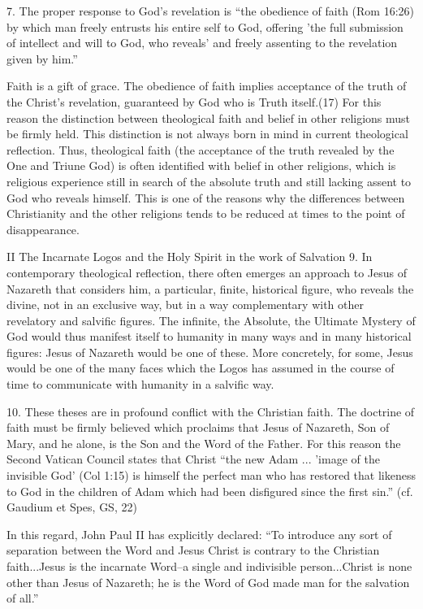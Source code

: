 \documentclass[oneside]{book}
\begin{document}
7. The proper response to God's revelation is ``the obedience of faith (Rom
16:26) by which man freely entrusts his entire self to God, offering 'the full
submission of intellect and will to God, who reveals' and freely assenting to
the revelation given by him.''

Faith is a gift of grace. The obedience of faith implies acceptance of the truth
of the Christ's revelation, guaranteed by God who is Truth itself.(17) For this
reason the distinction between theological faith and belief in other religions
must be firmly held. This distinction is not always born in mind in current
theological reflection. Thus, theological faith (the acceptance of the truth
revealed by the One and Triune God) is often identified with belief in other
religions, which is religious experience still in search of the absolute truth
and still lacking assent to God who reveals himself. This is one of the reasons
why the differences between Christianity and the other religions tends to be
reduced at times to the point of disappearance.

II The Incarnate Logos and the Holy Spirit in the work of Salvation
9. In contemporary theological reflection, there often emerges an approach to
Jesus of Nazareth that considers him, a particular, finite, historical figure,
who reveals the divine, not in an exclusive way, but in a way complementary with
other revelatory and salvific figures. The infinite, the Absolute, the Ultimate
Mystery of God would thus manifest itself to humanity in many ways and in many
historical figures: Jesus of Nazareth would be one of these. More concretely,
for some, Jesus would be one of the many faces which the Logos has assumed in
the course of time to communicate with humanity in a salvific way.

10. These theses are in profound conflict with the Christian faith. The doctrine
of faith must be firmly believed which proclaims that Jesus of Nazareth, Son of
Mary, and he alone, is the Son and the Word of the Father. For this reason the
Second Vatican Council states that Christ ``the new Adam ... 'image of the
invisible God' (Col 1:15) is himself the perfect man who has restored that
likeness to God in the children of Adam which had been disfigured since the
first sin.'' (cf. Gaudium et Spes, GS, 22)

In this regard, John Paul II has explicitly declared: ``To introduce any sort of
separation between the Word and Jesus Christ is contrary to the Christian
faith...Jesus is the incarnate Word--a single and indivisible person...Christ is
none other than Jesus of Nazareth; he is the Word of God made man for the
salvation of all.''
\end{document}
